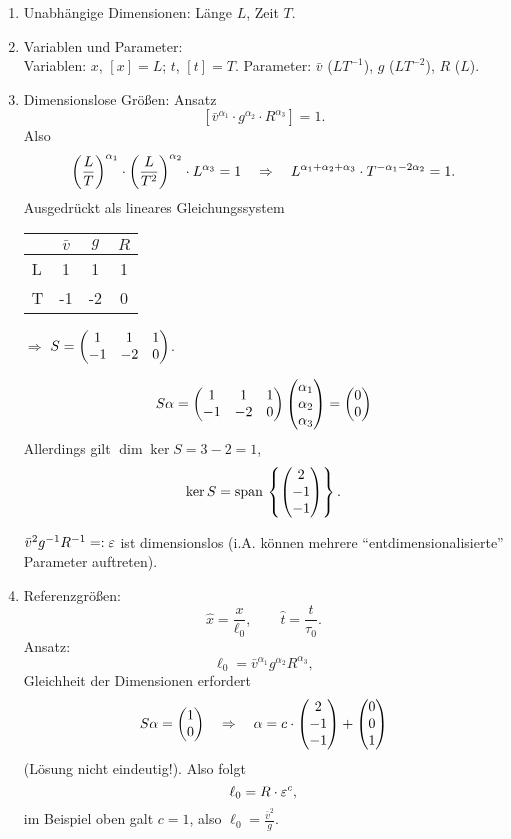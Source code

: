 \begin{enumerate}
\item Unabhängige Dimensionen: Länge $L$, Zeit $T$.
\item Variablen und Parameter: \\
  Variablen: $x$, $[x] = L$; $t$, $[t] = T$.
  Parameter: $\bar{v}$ ($LT^{-1}$), $g$ ($LT^{-2}$), $R$ ($L$).
\item Dimensionslose Größen:
  Ansatz
  \[ \left[ \bar{v}^{\alpha_1} \cdot g^{\alpha_2} \cdot R^{\alpha_3} \right] =
    1. \]
  Also
  \[ \left( \frac{L}{T} \right)^{\alpha_1} \cdot
    \left( \frac{L}{T^2} \right)^{\alpha_2} \cdot
    L^{\alpha_3} = 1 \quad \Rightarrow \quad L^{\alpha_1 + \alpha_2 + \alpha_3} \cdot T^{- \alpha_1
      - 2 \alpha_2} = 1. \]
  Ausgedrückt als lineares Gleichungssystem
  \begin{center}
  \begin{tabular}{l|ccc}
    & $\bar{v}$ & $g$ & $R$ \\
    \hline
    L & 1 & 1 & 1 \\
    T & -1 & -2 & 0
  \end{tabular}
  $\Rightarrow$
  $S = \begin{pmatrix} 1 & 1 & 1 \\ -1 & -2 & 0\end{pmatrix}$.
  \end{center}
  \[ S \alpha = \begin{pmatrix} 1 & 1 & 1 \\ -1 & -2 & 0\end{pmatrix} \begin{pmatrix} \alpha_1 \\ \alpha_2 \\
      \alpha_3\end{pmatrix} = \begin{pmatrix}0\\0\end{pmatrix} \]
  Allerdings gilt $\dim \ker S = 3 - 2 = 1$,
  \[ \ker S = \mathrm{span}\, \left\{ \begin{pmatrix} 2 \\ -1 \\ -1\end{pmatrix} \right \}. \]

  $\bar{v}^2 g^{-1} R^{-1} =: \varepsilon$ ist dimensionslos (i.A. können mehrere
  ``entdimensionalisierte'' Parameter auftreten).
\item Referenzgrößen:
  \[ \hat{x} = \frac{x}{\ell_0}, \qquad \hat{t} = \frac{t}{\tau_0}. \]
  Ansatz:
  \[ \ell_0 = \bar{v}^{\alpha_1} g^{\alpha_2} R^{\alpha_3}, \]
  Gleichheit der Dimensionen erfordert
  \[ S \alpha = \begin{pmatrix}1 \\ 0\end{pmatrix} \quad \Rightarrow \quad \alpha = c \cdot \begin{pmatrix}2 \\ -1 \\ -1\end{pmatrix} +
    \begin{pmatrix}0 \\ 0 \\ 1\end{pmatrix} \]
  (Lösung nicht eindeutig!). Also folgt
  \[ \ell_0 = R \cdot \varepsilon^c, \]
  im Beispiel oben galt $c = 1$, also $\ell_0 = \frac{\bar{v}^2}{g}$.


\end{enumerate}
